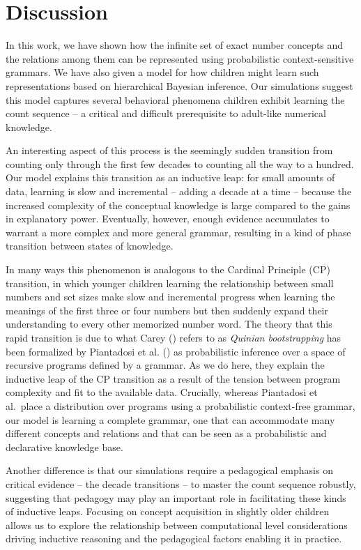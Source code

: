 \documentclass[10pt,letterpaper]{article}
\begin{document}
\section{Discussion}

In this work, we have shown how the infinite set of exact number
concepts and the relations among them can be represented using
probabilistic context-sensitive grammars. We have also given a model
for how children might learn such representations based on
hierarchical Bayesian inference. Our simulations suggest this model
captures several behavioral phenomena children exhibit learning the count
sequence -- a critical and difficult prerequisite to adult-like
numerical knowledge.

An interesting aspect of this process is the seemingly sudden
transition from counting only through the first few decades to
counting all the way to a hundred. Our model explains this transition
as an inductive leap: for small amounts of data, learning is slow and
incremental -- adding a decade at a time -- because the increased
complexity of the conceptual knowledge is large compared to the gains
in explanatory power. Eventually, however, enough evidence accumulates
to warrant a more complex and more general grammar, resulting
in a kind of phase transition between states of knowledge.

In many ways this phenomenon is analogous to the Cardinal Principle
(CP) transition, in which younger children learning the relationship
between small numbers and set sizes make slow and incremental progress
when learning the meanings of the first three or four numbers but then
suddenly expand their understanding to every other memorized number word.
The theory that this rapid transition is due to what Carey
(\citeyear{Car2009}) refers to as \emph{Quinian bootstrapping} has
been formalized by Piantadosi et al. (\citeyear{PianGoodTen2012}) as
probabilistic inference over a space of recursive programs defined by
a grammar. As we do here, they explain the inductive leap of the CP
transition as a result of the tension between program complexity and
fit to the available data. Crucially, whereas Piantadosi et al.~place
a distribution over programs using a probabilistic context-free
grammar, our model is learning a complete grammar, one that can
accommodate many different concepts and relations and that can be seen
as a probabilistic and declarative knowledge base.

Another difference is that our simulations require a pedagogical
emphasis on critical evidence -- the decade transitions -- to master
the count sequence robustly, suggesting that pedagogy may play an
important role in facilitating these kinds of inductive leaps.
Focusing on concept acquisition in slightly older children allows us
to explore the relationship between computational level considerations
driving inductive reasoning and the pedagogical factors enabling it in
practice.
\end{document}
